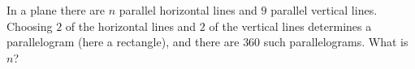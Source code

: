 In a plane there are $n$ parallel horizontal lines and $9$ parallel vertical lines. Choosing $2$ of the horizontal lines and $2$ of the vertical lines determines a parallelogram (here a rectangle), and there are $360$ such parallelograms. What is $n$?
